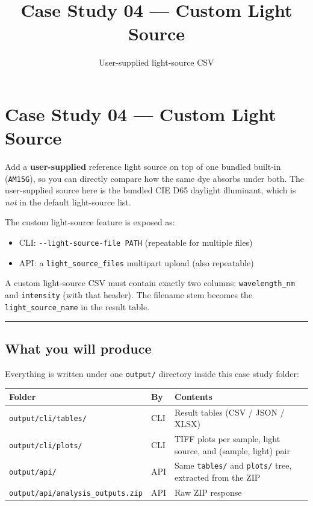 \documentclass[
  11pt,
]{article}
\title{Case Study 04 — Custom Light Source}
\subtitle{User-supplied light-source CSV}
\author{}
\date{}
\providecommand{\tightlist}{
  \setlength{\itemsep}{0pt}\setlength{\parskip}{0pt}}
\begin{document}
\maketitle

{
\hypersetup{linkcolor=}
\setcounter{tocdepth}{2}
\tableofcontents
}
\hypertarget{case-study-04--custom-light-source}{
\section{Case Study 04 --- Custom Light
Source}\label{case-study-04--custom-light-source}}

Add a \textbf{user-supplied} reference light source on top of one
bundled built-in (\texttt{AM15G}), so you can directly compare how the
same dye absorbs under both. The user-supplied source here is the
bundled CIE D65 daylight illuminant, which is \emph{not} in the default
light-source list.

The custom light-source feature is exposed as:

\begin{itemize}
\tightlist
\item
  CLI: \texttt{-\/-light-source-file\ PATH} (repeatable for multiple
  files)
\item
  API: a \texttt{light\_source\_files} multipart upload (also
  repeatable)
\end{itemize}

A custom light-source CSV must contain exactly two columns:
\texttt{wavelength\_nm} and \texttt{intensity} (with that header). The
filename stem becomes the \texttt{light\_source\_name} in the result
table.

\begin{center}\rule{0.5\linewidth}{0.5pt}\end{center}

\hypertarget{what-you-will-produce}{
\subsection{What you will produce}\label{what-you-will-produce}}

Everything is written under one \texttt{output/} directory inside this
case study folder:

\begin{longtable}[]{@{}lll@{}}
\toprule
Folder & By & Contents \\
\midrule
\endhead
\texttt{output/cli/tables/} & CLI & Result tables (CSV / JSON / XLSX) \\
\texttt{output/cli/plots/} & CLI & TIFF plots per sample, light source,
and (sample, light) pair \\
\texttt{output/api/} & API & Same \texttt{tables/} and \texttt{plots/}
tree, extracted from the ZIP \\
\texttt{output/api/analysis\_outputs.zip} & API & Raw ZIP response \\
\bottomrule
\end{longtable}
\end{document}
